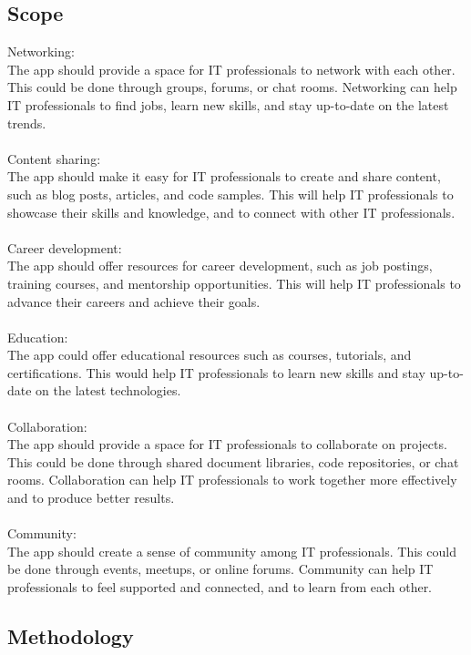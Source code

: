 \documentclass[12pt]{article}
\begin{document}
\subsection{Scope}
Networking:\\
The app should provide a space for IT professionals to network with each other. This could be done through groups, forums, or chat rooms. Networking can help IT professionals to find jobs, learn new skills, and stay up-to-date on the latest trends.\\\\
Content sharing:\\
The app should make it easy for IT professionals to create and share content, such as blog posts, articles, and code samples. This will help IT professionals to showcase their skills and knowledge, and to connect with other IT professionals.\\\\
Career development:\\
The app should offer resources for career development, such as job postings, training courses, and mentorship opportunities. This will help IT professionals to advance their careers and achieve their goals.\\\\
Education:\\
The app could offer educational resources such as courses, tutorials, and certifications. This would help IT professionals to learn new skills and stay up-to-date on the latest technologies.\\\\
Collaboration:\\
The app should provide a space for IT professionals to collaborate on projects. This could be done through shared document libraries, code repositories, or chat rooms. Collaboration can help IT professionals to work together more effectively and to produce better results.\\\\
Community:\\
The app should create a sense of community among IT professionals. This could be done through events, meetups, or online forums. Community can help IT professionals to feel supported and connected, and to learn from each other.\\

\subsection{Methodology}
\end{document}

